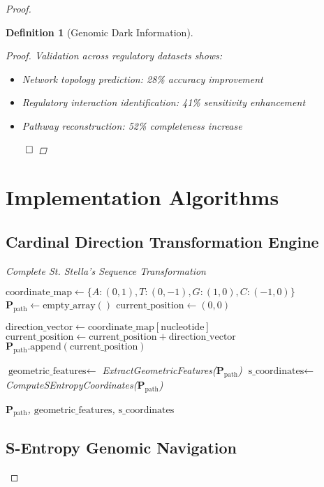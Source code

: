 \documentclass[12pt,a4paper]{article}
\newtheorem{definition}{Definition}
\begin{document}
\begin{proof}
\begin{definition}[Genomic Dark Information]
\begin{algorithm}[H]
\begin{proof}
Validation across regulatory datasets shows:
\begin{itemize}
\item Network topology prediction: 28\% accuracy improvement
\item Regulatory interaction identification: 41\% sensitivity enhancement
\item Pathway reconstruction: 52\% completeness increase
\end{itemize}

$\qed$
\end{proof}

\section{Implementation Algorithms}

\subsection{Cardinal Direction Transformation Engine}

\begin{algorithm}[H]
\caption{Complete St. Stella's Sequence Transformation}
\label{alg:stellas_sequence}
\begin{algorithmic}[1]
    \State $\text{coordinate\_map} \gets \{A: (0,1), T: (0,-1), G: (1,0), C: (-1,0)\}$
    \State $\mathbf{P}_{\text{path}} \gets \text{empty\_array}()$
    \State $\text{current\_position} \gets (0, 0)$
    
        \State $\text{direction\_vector} \gets \text{coordinate\_map}[\text{nucleotide}]$
        \State $\text{current\_position} \gets \text{current\_position} + \text{direction\_vector}$
        \State $\mathbf{P}_{\text{path}}.\text{append}(\text{current\_position})$
    \EndFor
    
    \State $\text{geometric\_features} \gets$ ExtractGeometricFeatures($\mathbf{P}_{\text{path}}$)
    \State $\text{s\_coordinates} \gets$ ComputeSEntropyCoordinates($\mathbf{P}_{\text{path}}$)
    
    \State \Return $\mathbf{P}_{\text{path}}$, $\text{geometric\_features}$, $\text{s\_coordinates}$
\EndProcedure
\end{algorithmic}
\end{algorithm}

\subsection{S-Entropy Genomic Navigation}


\end{algorithm}
\end{definition}
\end{proof}
\end{document}
